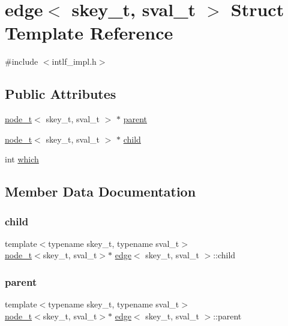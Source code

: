 \hypertarget{structedge}{}\section{edge$<$ skey\+\_\+t, sval\+\_\+t $>$ Struct Template Reference}
\label{structedge}


{\ttfamily \#include $<$intlf\+\_\+impl.\+h$>$}

\subsection*{Public Attributes}
\begin{DoxyCompactItemize}
\item 
\hyperlink{structnode__t}{node\+\_\+t}$<$ skey\+\_\+t, sval\+\_\+t $>$ $\ast$ \hyperlink{structedge_aa383257f4d0443f8951fb919a14f2419}{parent}
\item 
\hyperlink{structnode__t}{node\+\_\+t}$<$ skey\+\_\+t, sval\+\_\+t $>$ $\ast$ \hyperlink{structedge_af6ec5aaa10f981d0db55273296bcff51}{child}
\item 
int \hyperlink{structedge_a929c5d2b1d7044f230b39abbacfa5789}{which}
\end{DoxyCompactItemize}


\subsection{Member Data Documentation}
\mbox{\label{structedge_af6ec5aaa10f981d0db55273296bcff51}} 
\subsubsection{\texorpdfstring{child}{child}}
{\footnotesize\ttfamily template$<$typename skey\+\_\+t, typename sval\+\_\+t$>$ \\
\hyperlink{structnode__t}{node\+\_\+t}$<$skey\+\_\+t, sval\+\_\+t$>$$\ast$ \hyperlink{structedge}{edge}$<$ skey\+\_\+t, sval\+\_\+t $>$\+::child}

\mbox{\label{structedge_aa383257f4d0443f8951fb919a14f2419}} 
\subsubsection{\texorpdfstring{parent}{parent}}
{\footnotesize\ttfamily template$<$typename skey\+\_\+t, typename sval\+\_\+t$>$ \\
\hyperlink{structnode__t}{node\+\_\+t}$<$skey\+\_\+t, sval\+\_\+t$>$$\ast$ \hyperlink{structedge}{edge}$<$ skey\+\_\+t, sval\+\_\+t $>$\+::parent}

